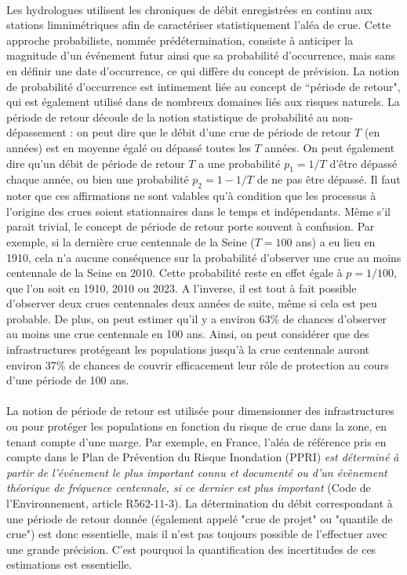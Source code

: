 	\paragraph{} Les hydrologues utilisent les chroniques de débit enregistrées en continu aux stations limnimétriques afin de caractériser statistiquement l'aléa de crue. Cette approche probabiliste, nommée prédétermination, consiste à anticiper la magnitude d'un événement futur ainsi que sa probabilité d'occurrence, mais sans en définir une date d'occurrence, ce qui diffère du concept de prévision. La notion de probabilité d'occurrence est intimement liée au concept de ``période de retour", qui est également utilisé dans de nombreux domaines liés aux risques naturels. La période de retour découle de la notion statistique de probabilité au non-dépassement : on peut dire que le débit d'une crue de période de retour $T$ (en années) est en moyenne égalé ou dépassé toutes les $T$ années. On peut également dire qu'un débit de période de retour $T$ a une probabilité $p_1 = 1/T$ d'être dépassé chaque année, ou bien une probabilité $p_2 = 1-1/T$ de ne pas être dépassé. Il faut noter que ces affirmations ne sont valables qu'à condition que les processus à l'origine des crues soient stationnaires dans le temps et indépendants. Même s'il parait trivial, le concept de période de retour porte souvent à confusion. Par exemple, si la dernière crue centennale de la Seine ($T = 100$ ans) a eu lieu en 1910, cela n'a aucune conséquence sur la probabilité d'observer une crue au moins centennale de la Seine en 2010. Cette probabilité reste en effet égale à $p = 1/100$, que l'on soit en 1910, 2010 ou 2023. A l'inverse, il est tout à fait possible d'observer deux crues centennales deux années de suite, même si cela est peu probable. De plus, on peut estimer qu'il y a environ 63\% de chances d'observer au moins une crue centennale en 100 ans. Ainsi, on peut considérer que des infrastructures protégeant les populations jusqu'à la crue centennale auront environ 37\% de chances de couvrir efficacement leur rôle de protection au cours d'une période de 100 ans. 	
	
	\paragraph{} La notion de période de retour est utilisée pour dimensionner des infrastructures ou pour protéger les populations en fonction du risque de crue dans la zone, en tenant compte d'une marge. Par exemple, en France, l'aléa de référence pris en compte dans le Plan de Prévention du Risque Inondation (PPRI) \og \textit{est déterminé à partir de l'événement le plus important connu et documenté ou d'un évènement théorique de fréquence centennale, si ce dernier est plus important}\fg{} (Code de l'Environnement, article R562-11-3). La détermination du débit correspondant à une période de retour donnée (également appelé "crue de projet" ou "quantile de crue") est donc essentielle, mais il n'est pas toujours possible de l'effectuer avec une grande précision. C'est pourquoi la quantification des incertitudes de ces estimations est essentielle.
	
